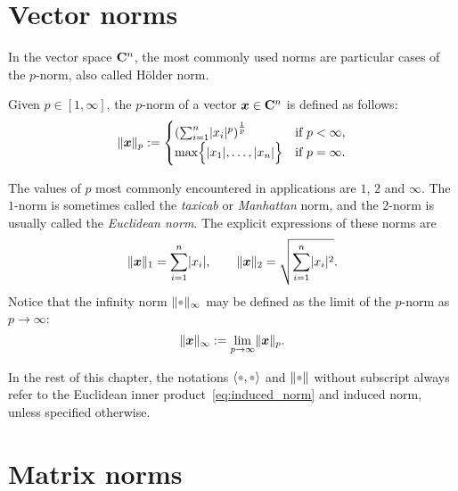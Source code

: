 \section{Vector norms}%
\label{sub:vector_norms}

In the vector space $\mathbf C^n$,
the most commonly used norms are particular cases of the $p$-norm, also called H\"older norm.

\begin{definition}
    \label{definition:pnorm_vector}
    Given $p \in [1, \infty]$,
    the $p$-norm of a vector $\mathbf{\boldsymbol{x}} \in \mathbf C^n$ is defined as follows:
    \[
        \lVert\mathbf{\boldsymbol{x}}\rVert_p :=
        \begin{cases}
            \left( \sum_{i=1}^{n} \lvert x_i\rvert^p \right)^{\frac{1}{p}} & \text{if $p < \infty$}, \\
            \max \Bigl\{ \lvert x_1\rvert, \dotsc, \lvert x_n\rvert \Bigr\} & \text{if $p = \infty$}.
        \end{cases}
    \]
\end{definition}
The values of $p$ most commonly encountered in applications are $1$, $2$ and $\infty$.
The $1$-norm is sometimes called the \emph{taxicab} or \emph{Manhattan} norm,
and the $2$-norm is usually called the \emph{Euclidean norm}.
The explicit expressions of these norms are
\[
    \lVert\mathbf{\boldsymbol{x}}\rVert_1 = \sum_{i=1}^{n} \lvert x_i\rvert,
    \qquad
    \lVert\mathbf{\boldsymbol{x}}\rVert_2 = \sqrt{\sum_{i=1}^{n} \lvert x_i\rvert^2}.
\]
Notice that the infinity norm $\norm{\placeholder}_{\infty}$ may be defined as the limit of the $p$-norm as $p \to \infty$:
\[
    \lVert\mathbf{\boldsymbol{x}}\rVert_{\infty}
    := \lim_{p \to \infty} \lVert\mathbf{\boldsymbol{x}}\rVert_p.
\]

In the rest of this chapter,
the notations $\ip{\placeholder,\placeholder}$ and $\norm{\placeholder}$ without subscript always refer to the Euclidean inner product~\eqref{eq:induced_norm} and induced norm,
unless specified otherwise.

\section{Matrix norms}%
\label{sec:matrix_norms}

